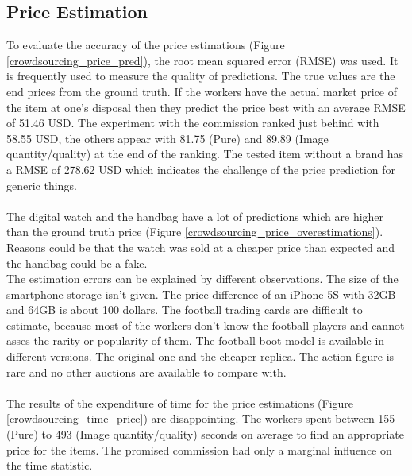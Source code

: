 \subsection{Price Estimation}
To evaluate the accuracy of the price estimations (Figure \ref{crowdsourcing_price_pred}), the root mean squared error (RMSE) was used. It is frequently used to measure the quality of predictions. The true values are the end prices from the ground truth. If the workers have the actual market price of the item at one's disposal then they predict the price best with an average RMSE of 51.46 USD. The experiment with the commission ranked just behind with 58.55 USD, the others appear with 81.75 (Pure) and 89.89 (Image quantity/quality) at the end of the ranking. The tested item without a brand has a RMSE of 278.62 USD which indicates the challenge of the price prediction for generic things.\\\\
The digital watch and the handbag have a lot of predictions which are higher than the ground truth price (Figure \ref{crowdsourcing_price_overestimations}). Reasons could be that the watch was sold at a cheaper price than expected and the handbag could be a fake.\\
The estimation errors can be explained by different observations. The size of the smartphone storage isn't given. The price difference of an iPhone 5S with 32GB and 64GB is about 100 dollars. The football trading cards are difficult to estimate, because most of the workers don't know the football players and cannot asses the rarity or popularity of them. The football boot model is available in different versions. The original one and the cheaper replica. The action figure is rare and no other auctions are available to compare with.\\\\
The results of the expenditure of time for the price estimations (Figure \ref{crowdsourcing_time_price}) are disappointing. The workers spent between 155 (Pure) to 493 (Image quantity/quality) seconds on average to find an appropriate price for the items. The promised commission had only a marginal influence on the time statistic.\\
